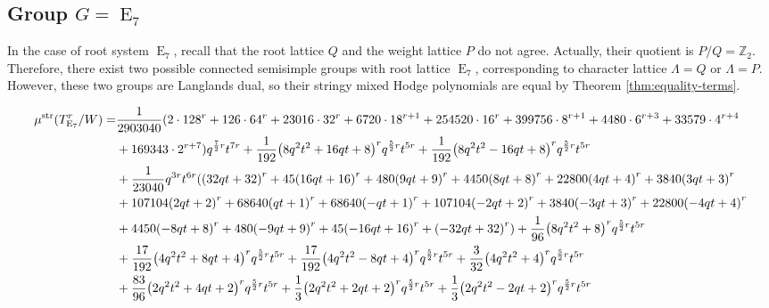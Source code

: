 \documentclass[11pt,english]{amsart}
\numberwithin{equation}{section}
\numberwithin{figure}{section}
\theoremstyle{plain}
\theoremstyle{plain}
\theoremstyle{definition}
\theoremstyle{remark}
\newcommand{\ZZ}{\mathbb{Z}}
\newcommand{\E}{\operatorname{E}}
\newcommand{\str}{\textup{str}}
\begin{document}
\subsection{Group $G = \E_7$}
In the case of root system $\E_7$, recall that the root lattice $Q$ and the weight lattice $P$ do not agree. Actually, their quotient is $P/Q = \ZZ_2$. Therefore, there exist two possible connected semisimple groups with root lattice $\E_7$, corresponding to character lattice $\Lambda = Q$ or $\Lambda = P$. However, these two groups are Langlands dual, so their stringy mixed Hodge polynomials are equal by Theorem \ref{thm:equality-terms}.

{\tiny
\begin{align*}
\mu^{\str}(T_{\E_7}^r/W) = & \frac{1}{2903040} (2 \cdot 128^{r} + 126 \cdot 64^{r} + 23016 \cdot 32^{r} + 6720 \cdot 18^{r + 1} + 254520 \cdot 16^{r} + 399756 \cdot 8^{r + 1} + 4480 \cdot 6^{r + 3} + 33579 \cdot 4^{r + 4} \\
& + 169343 \cdot 2^{r + 7}) q^{\frac{7}{2}r}t^{7r} + \frac{1}{192} {\left(8 q^{2} t^{2} + 16 q t + 8\right)}^{r} q^{\frac{5}{2} r}t^{5r} + \frac{1}{192} {\left(8 q^{2} t^{2} - 16 q t + 8\right)}^{r} q^{\frac{5}{2} r}t^{5r} \\
& + \frac{1}{23040} q^{3 r} t^{{6 r}} ({\left(32 q t + 32\right)}^{r} + 45 {\left(16 q t + 16\right)}^{r} + 480 {\left(9 q t + 9\right)}^{r} + 4450 {\left(8 q t + 8\right)}^{r} + 22800 {\left(4 q t + 4\right)}^{r} + 3840 {\left(3 q t + 3\right)}^{r} \\
& + 107104 {\left(2 q t + 2\right)}^{r} + 68640 {\left(q t + 1\right)}^{r} + 68640 {\left(-q t + 1\right)}^{r} + 107104 {\left(-2 q t + 2\right)}^{r} + 3840 {\left(-3 q t + 3\right)}^{r} + 22800 {\left(-4 q t + 4\right)}^{r} \\
& + 4450 {\left(-8 q t + 8\right)}^{r} + 480 {\left(-9 q t + 9\right)}^{r} + 45 {\left(-16 q t + 16\right)}^{r} + {\left(-32 q t + 32\right)}^{r}) + \frac{1}{96} {\left(8 q^{2} t^{2} + 8\right)}^{r} q^{\frac{5}{2} r}t^{5r} \\
& + \frac{17}{192} {\left(4 q^{2} t^{2} + 8 q t + 4\right)}^{r} q^{\frac{5}{2} r}t^{5r} + \frac{17}{192} {\left(4 q^{2} t^{2} - 8 q t + 4\right)}^{r} q^{\frac{5}{2} r}t^{5r} + \frac{3}{32} {\left(4 q^{2} t^{2} + 4\right)}^{r} q^{\frac{5}{2} r}t^{5r} \\
& + \frac{83}{96} {\left(2 q^{2} t^{2} + 4 q t + 2\right)}^{r} q^{\frac{5}{2} r}t^{5r} + \frac{1}{3} {\left(2 q^{2} t^{2} + 2 q t + 2\right)}^{r} q^{\frac{5}{2} r}t^{5r} + \frac{1}{3} {\left(2 q^{2} t^{2} - 2 q t + 2\right)}^{r} q^{\frac{5}{2} r}t^{5r} \\

\end{align*}}
\end{document}
